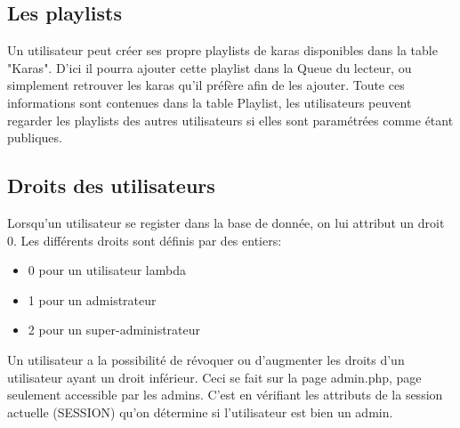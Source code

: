 \subsection{Les playlists}

Un utilisateur peut créer ses propre playlists de karas disponibles dans la table "Karas". D'ici il pourra ajouter cette playlist dans la Queue du lecteur, ou simplement retrouver les karas qu'il préfère afin de les ajouter. Toute ces informations sont contenues dans la table Playlist, les utilisateurs peuvent regarder les playlists des autres utilisateurs si elles sont paramétrées comme étant publiques.\newline

\subsection{Droits des utilisateurs}
Lorsqu'un utilisateur se register dans la base de donnée, on lui attribut un droit 0. Les différents droits sont définis par des entiers:
\begin{itemize}
	\item 0 pour un utilisateur lambda
	\item 1 pour un admistrateur
	\item 2 pour un super-administrateur
\end{itemize}
Un utilisateur a la possibilité de révoquer ou d'augmenter les droits d'un utilisateur ayant un droit inférieur. Ceci se fait sur la page admin.php, page seulement accessible par les admins. C'est en vérifiant les attributs de la session actuelle (SESSION) qu'on détermine si l'utilisateur est bien un admin.
